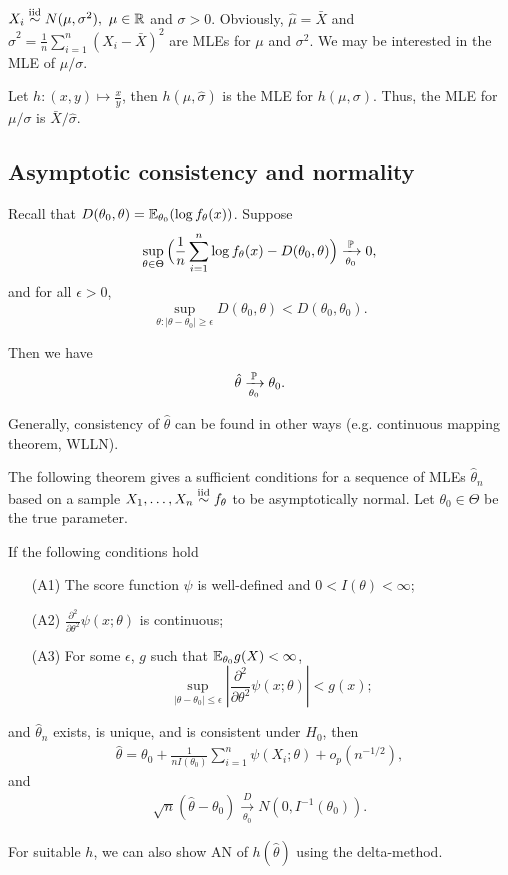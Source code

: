 \begin{exap}
	$X_i \stackrel{\text{iid}}{\sim} N(\mu, \sigma^2),\ \mu \in \mathbb{R}$ and $\sigma>0$. Obviously, $\hat{\mu} = \bar{X}$ and $\hat{\sigma}^2 = \frac{1}{n} \sum_{i=1}^n (X_i - \bar{X})^2$ are MLEs for $\mu$ and $\sigma^2$. We may be interested in the MLE of $\mu/ \sigma$.
	
	Let $h: (x,y) \mapsto \frac{x}{y}$, then $h(\hat{\mu}, \hat{\sigma})$ is the MLE for $h(\mu, \sigma)$. Thus, the MLE for $\mu/ \sigma$ is $\bar{X}/\hat{\sigma}$.
	
\end{exap}

\subsection{Asymptotic consistency and normality}
\begin{thm}[Wald]
	Recall that $D(\theta_0, \theta) = \mathbb{E}_{\theta_0} ( \log f_\theta(x) )$. Suppose 
	$$ \sup_{\theta \in \Theta} \Big(  \frac{1}{n}\sum_{i=1}^n \log f_\theta (x) - D(\theta_0, \theta)  \Big) \xrightarrow[\theta_0]{\mathbb{P}} 0,$$
	and for all $\epsilon>0$, 
	$$\sup_{ \theta:| \theta - \theta_0 |\geq \epsilon } D(\theta_0, \theta) < D(\theta_0, \theta_0).$$
	
	Then we have
	$$\hat{\theta} \xrightarrow[\theta_0]{\mathbb{P}} \theta_0.$$
\end{thm}
\begin{remark}
	Generally, consistency of $\hat{\theta}$ can be found in other ways (e.g. continuous mapping theorem, WLLN).
\end{remark}
 
The following theorem gives a sufficient conditions for a sequence of MLEs $\hat{\theta}_n$ based on a sample $X_1, \dots, X_n \stackrel{\text{iid}}{\sim} f_\theta$ to be asymptotically normal. Let $\theta_0 \in \Theta$ be the true parameter.
\begin{thm}
	If the following conditions hold
	\begin{enumerate}
		\item[(A1)] The score function $\psi$ is well-defined and $0< I(\theta) < \infty$;
		\item[(A2)] $\frac{\partial^2}{\partial \theta^2} \psi(x; \theta)$ is continuous;
		\item[(A3)] For some $\epsilon$, $g$ such that $\mathbb{E}_{\theta_0} g(X) < \infty$,
		$$ \sup_{| \theta - \theta_0 |\leq \epsilon} |\frac{\partial^2}{\partial \theta^2} \psi(x; \theta)| < g(x);$$
	\end{enumerate}
	and $\hat{\theta}_n$ exists, is unique, and is consistent under $H_0$, then 
	\begin{align*}
		\hat{\theta} = \theta_0 + \frac{1}{n I(\theta_0)} \sum_{i=1}^n \psi(X_i; \theta) + o_{p}(n^{-1/2}),
	\end{align*} 
	and 
	{\color{blue}
	\begin{align*}
		\sqrt{n} (\hat{\theta} - \theta_0) \xrightarrow[\theta_0]{D} N(0, I^{-1}(\theta_0) ).
	\end{align*}}
\end{thm}
\begin{remark}
	For suitable $h$, we can also show AN of $h(\hat{\theta})$ using the delta-method.
\end{remark}

